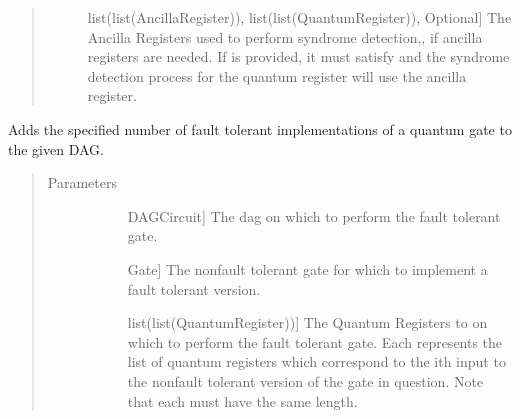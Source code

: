 \documentclass[letterpaper,10pt,english]{sphinxmanual}
\begin{document}
\begin{fulllineitems}
\begin{fulllineitems}
\begin{quote}
\begin{description}
\begin{description}
\item[{}] \leavevmode{[}list(list(AncillaRegister)), list(list(QuantumRegister)), Optional{]}
The Ancilla Registers used to perform syndrome detection,, if ancilla registers are needed. If  is provided, it must satisfy  and the syndrome detection process for the  quantum register will use the  ancilla register.

\end{description}

\end{description}\end{quote}

\end{fulllineitems}


\begin{fulllineitems}
\label{\detokenize{Base:BaseFaultTolerance.FaultTolerantGates.addGateDag}}
Adds the specified number of fault tolerant implementations of a quantum gate to the given DAG.
\begin{quote}\begin{description}
\item[{Parameters}] \leavevmode\begin{description}
\item[{}] \leavevmode{[}DAGCircuit{]}
The dag on which to perform the fault tolerant gate.

\item[{}] \leavevmode{[}Gate{]}
The non\sphinxhyphen{}fault tolerant gate for which to implement a fault tolerant version.

\item[{}] \leavevmode{[}list(list(QuantumRegister)){]}
The Quantum Registers to on which to perform the fault tolerant gate. Each  represents the list of quantum registers which correspond to the ith input to the non\sphinxhyphen{}fault tolerant version of the gate in question. Note that each  must have the same length.


\end{description}
\end{description}
\end{quote}
\end{fulllineitems}
\end{fulllineitems}
\end{document}
